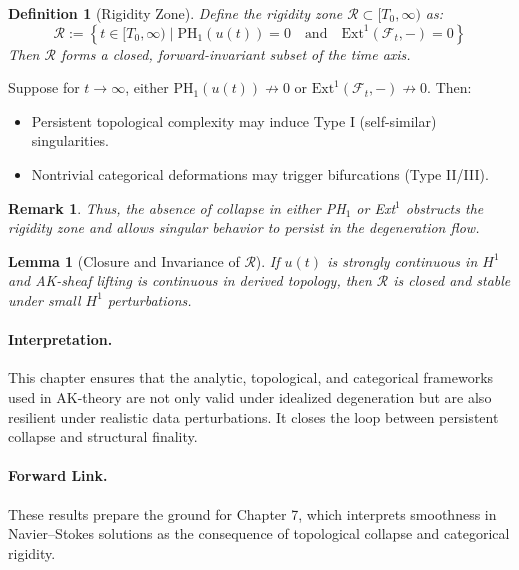 \documentclass[11pt]{article}
\newtheorem{definition}[theorem]{Definition}
\newtheorem{remark}[theorem]{Remark}
\newtheorem{lemma}[theorem]{Lemma}
\begin{document}
\begin{definition}[Rigidity Zone]
Define the rigidity zone $\mathcal{R} \subset [T_0, \infty)$ as:
\[
\mathcal{R} := \left\{ t \in [T_0, \infty) \mid \mathrm{PH}_1(u(t)) = 0 \quad \text{and} \quad \mathrm{Ext}^1(\mathcal{F}_t, -) = 0 \right\}
\]
Then $\mathcal{R}$ forms a closed, forward-invariant subset of the time axis.
\end{definition}

\begin{proposition}
Suppose for $t \to \infty$, either $\mathrm{PH}_1(u(t)) \not\to 0$ or $\mathrm{Ext}^1(\mathcal{F}_t, -) \not\to 0$. Then:

\begin{itemize}
    \item Persistent topological complexity may induce Type I (self-similar) singularities.
    \item Nontrivial categorical deformations may trigger bifurcations (Type II/III).
\end{itemize}
\end{proposition}

\begin{remark}
Thus, the absence of collapse in either PH$_1$ or Ext$^1$ obstructs the rigidity zone and allows singular behavior to persist in the degeneration flow.
\end{remark}

\begin{lemma}[Closure and Invariance of $\mathcal{R}$]
If $u(t)$ is strongly continuous in $H^1$ and AK-sheaf lifting is continuous in derived topology, then $\mathcal{R}$ is closed and stable under small $H^1$ perturbations.
\end{lemma}

\paragraph{Interpretation.} 
This chapter ensures that the analytic, topological, and categorical frameworks used in AK-theory are not only valid under idealized degeneration but are also resilient under realistic data perturbations. It closes the loop between persistent collapse and structural finality.

\paragraph{Forward Link.}
These results prepare the ground for Chapter 7, which interprets smoothness in Navier–Stokes solutions as the consequence of topological collapse and categorical rigidity.
\end{document}
